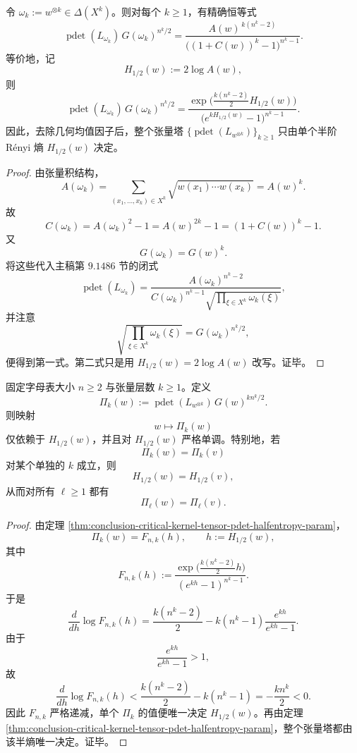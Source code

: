 \begin{theorem}[张量幂伪行列式的半熵单参数化]\label{thm:conclusion-critical-kernel-tensor-pdet-halfentropy-param}
令 \(\omega_k:=w^{\otimes k}\in \Delta(X^k)\)。则对每个 \(k\ge 1\)，有精确恒等式
\[
\operatorname{pdet}(L_{\omega_k})\,G(\omega_k)^{n^k/2}
=
\frac{A(w)^{\,k(n^k-2)}}{\bigl((1+C(w))^k-1\bigr)^{n^k-1}}.
\]
等价地，记
\[
H_{1/2}(w):=2\log A(w),
\]
则
\[
\operatorname{pdet}(L_{\omega_k})\,G(\omega_k)^{n^k/2}
=
\frac{\exp\!\bigl(\frac{k(n^k-2)}{2}H_{1/2}(w)\bigr)}
{\bigl(e^{kH_{1/2}(w)}-1\bigr)^{n^k-1}}.
\]
因此，去除几何均值因子后，整个张量塔 \(\{\operatorname{pdet}(L_{w^{\otimes k}})\}_{k\ge 1}\) 只由单个半阶 Rényi 熵 \(H_{1/2}(w)\) 决定。
\end{theorem}
\begin{proof}
由张量积结构，
\[
A(\omega_k)
=
\sum_{(x_1,\dots,x_k)\in X^k}\sqrt{w(x_1)\cdots w(x_k)}
=
A(w)^k.
\]
故
\[
C(\omega_k)=A(\omega_k)^2-1=A(w)^{2k}-1=(1+C(w))^k-1.
\]
又
\[
G(\omega_k)=G(w)^k.
\]
将这些代入主稿第 \(9.1486\) 节的闭式
\[
\operatorname{pdet}(L_{\omega_k})
=
\frac{A(\omega_k)^{n^k-2}}
{C(\omega_k)^{n^k-1}\sqrt{\prod_{\xi\in X^k}\omega_k(\xi)}},
\]
并注意
\[
\sqrt{\prod_{\xi\in X^k}\omega_k(\xi)}=G(\omega_k)^{n^k/2},
\]
便得到第一式。第二式只是用 \(H_{1/2}(w)=2\log A(w)\) 改写。证毕。
\end{proof}

\begin{corollary}[单层张量伪行列式即可唯一恢复半熵]\label{cor:conclusion-critical-kernel-single-layer-pdet-recovers-halfentropy}
固定字母表大小 \(n\ge 2\) 与张量层数 \(k\ge 1\)。定义
\[
\Pi_k(w):=\operatorname{pdet}(L_{w^{\otimes k}})\,G(w)^{k n^k/2}.
\]
则映射
\[
w\longmapsto \Pi_k(w)
\]
仅依赖于 \(H_{1/2}(w)\)，并且对 \(H_{1/2}(w)\) 严格单调。特别地，若
\[
\Pi_k(w)=\Pi_k(v)
\]
对某个单独的 \(k\) 成立，则
\[
H_{1/2}(w)=H_{1/2}(v),
\]
从而对所有 \(\ell\ge 1\) 都有
\[
\Pi_\ell(w)=\Pi_\ell(v).
\]
\end{corollary}
\begin{proof}
由定理 \ref{thm:conclusion-critical-kernel-tensor-pdet-halfentropy-param}，
\[
\Pi_k(w)=F_{n,k}(h),
\qquad
h:=H_{1/2}(w),
\]
其中
\[
F_{n,k}(h)
:=
\frac{\exp\!\bigl(\frac{k(n^k-2)}2h\bigr)}
{(e^{kh}-1)^{n^k-1}}.
\]
于是
\[
\frac{d}{dh}\log F_{n,k}(h)
=
\frac{k(n^k-2)}2
-k(n^k-1)\frac{e^{kh}}{e^{kh}-1}.
\]
由于
\[
\frac{e^{kh}}{e^{kh}-1}>1,
\]
故
\[
\frac{d}{dh}\log F_{n,k}(h)
<
\frac{k(n^k-2)}2-k(n^k-1)
=
-\frac{k n^k}{2}
<0.
\]
因此 \(F_{n,k}\) 严格递减，单个 \(\Pi_k\) 的值便唯一决定 \(H_{1/2}(w)\)。再由定理 \ref{thm:conclusion-critical-kernel-tensor-pdet-halfentropy-param}，整个张量塔都由该半熵唯一决定。证毕。
\end{proof}

